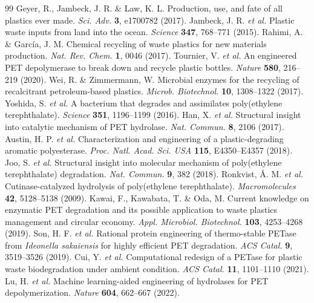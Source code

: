 \documentclass[10pt,twocolumn,a4paper]{article}
\begin{document}
\begin{thebibliography}{99}
 Geyer, R., Jambeck, J. R. \& Law, K. L. Production, use, and fate of all plastics ever made. \textit{Sci. Adv.} \textbf{3}, e1700782 (2017).
 Jambeck, J. R. \textit{et al.} Plastic waste inputs from land into the ocean. \textit{Science} \textbf{347}, 768--771 (2015).
 Rahimi, A. \& García, J. M. Chemical recycling of waste plastics for new materials production. \textit{Nat. Rev. Chem.} \textbf{1}, 0046 (2017).
 Tournier, V. \textit{et al.} An engineered PET depolymerase to break down and recycle plastic bottles. \textit{Nature} \textbf{580}, 216--219 (2020).
 Wei, R. \& Zimmermann, W. Microbial enzymes for the recycling of recalcitrant petroleum-based plastics. \textit{Microb. Biotechnol.} \textbf{10}, 1308--1322 (2017).
 Yoshida, S. \textit{et al.} A bacterium that degrades and assimilates poly(ethylene terephthalate). \textit{Science} \textbf{351}, 1196--1199 (2016).
 Han, X. \textit{et al.} Structural insight into catalytic mechanism of PET hydrolase. \textit{Nat. Commun.} \textbf{8}, 2106 (2017).
 Austin, H. P. \textit{et al.} Characterization and engineering of a plastic-degrading aromatic polyesterase. \textit{Proc. Natl. Acad. Sci. USA} \textbf{115}, E4350--E4357 (2018).
 Joo, S. \textit{et al.} Structural insight into molecular mechanism of poly(ethylene terephthalate) degradation. \textit{Nat. Commun.} \textbf{9}, 382 (2018).
 Ronkvist, \AA{}. M. \textit{et al.} Cutinase-catalyzed hydrolysis of poly(ethylene terephthalate). \textit{Macromolecules} \textbf{42}, 5128--5138 (2009).
 Kawai, F., Kawabata, T. \& Oda, M. Current knowledge on enzymatic PET degradation and its possible application to waste plastics management and circular economy. \textit{Appl. Microbiol. Biotechnol.} \textbf{103}, 4253--4268 (2019).
 Son, H. F. \textit{et al.} Rational protein engineering of thermo-stable PETase from \textit{Ideonella sakaiensis} for highly efficient PET degradation. \textit{ACS Catal.} \textbf{9}, 3519--3526 (2019).
 Cui, Y. \textit{et al.} Computational redesign of a PETase for plastic waste biodegradation under ambient condition. \textit{ACS Catal.} \textbf{11}, 1101--1110 (2021).
 Lu, H. \textit{et al.} Machine learning-aided engineering of hydrolases for PET depolymerization. \textit{Nature} \textbf{604}, 662--667 (2022).

\end{thebibliography}
\end{document}
